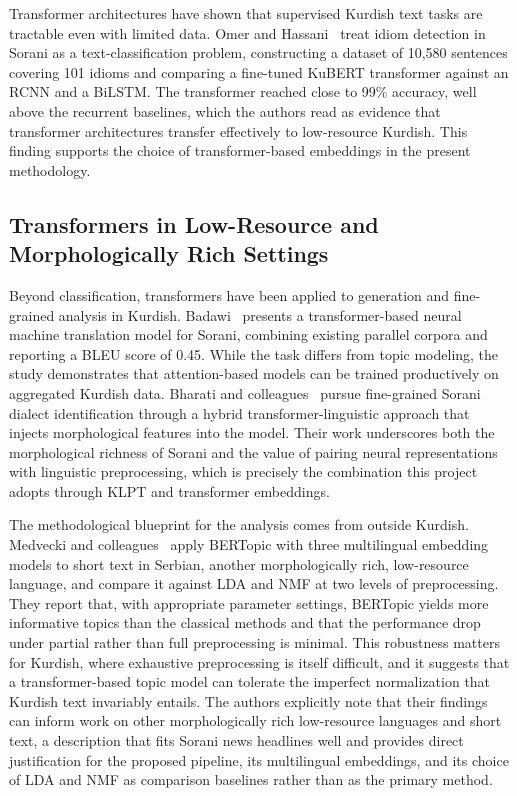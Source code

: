 \documentclass[12pt,a4paper]{article}
\begin{document}
Transformer architectures have shown that supervised Kurdish text tasks are tractable even with limited data. Omer and Hassani~\cite{omerIdiomDetectionSorani2025} treat idiom detection in Sorani as a text-classification problem, constructing a dataset of 10,580 sentences covering 101 idioms and comparing a fine-tuned KuBERT transformer against an RCNN and a BiLSTM. The transformer reached close to 99\% accuracy, well above the recurrent baselines, which the authors read as evidence that transformer architectures transfer effectively to low-resource Kurdish. This finding supports the choice of transformer-based embeddings in the present methodology.

\subsection{Transformers in Low-Resource and Morphologically Rich Settings}
Beyond classification, transformers have been applied to generation and fine-grained analysis in Kurdish. Badawi~\cite{badawiTransformerBasedNeuralNetwork2023} presents a transformer-based neural machine translation model for Sorani, combining existing parallel corpora and reporting a BLEU score of 0.45. While the task differs from topic modeling, the study demonstrates that attention-based models can be trained productively on aggregated Kurdish data. Bharati and colleagues~\cite{bharatiMorphologicalFeatureExtraction2026} pursue fine-grained Sorani dialect identification through a hybrid transformer-linguistic approach that injects morphological features into the model. Their work underscores both the morphological richness of Sorani and the value of pairing neural representations with linguistic preprocessing, which is precisely the combination this project adopts through KLPT and transformer embeddings.

The methodological blueprint for the analysis comes from outside Kurdish. Medvecki and colleagues~\cite{medveckiMultilingualTransformerBERTopic2024} apply BERTopic with three multilingual embedding models to short text in Serbian, another morphologically rich, low-resource language, and compare it against LDA and NMF at two levels of preprocessing. They report that, with appropriate parameter settings, BERTopic yields more informative topics than the classical methods and that the performance drop under partial rather than full preprocessing is minimal. This robustness matters for Kurdish, where exhaustive preprocessing is itself difficult, and it suggests that a transformer-based topic model can tolerate the imperfect normalization that Kurdish text invariably entails. The authors explicitly note that their findings can inform work on other morphologically rich low-resource languages and short text, a description that fits Sorani news headlines well and provides direct justification for the proposed pipeline, its multilingual embeddings, and its choice of LDA and NMF as comparison baselines rather than as the primary method.

\clearpage
\printbibliography[heading=bibnumbered,title={References}]
\end{document}

